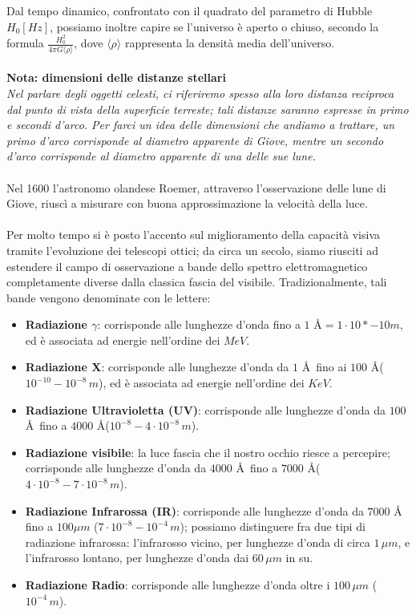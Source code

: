 Dal tempo dinamico, confrontato con il quadrato del parametro di Hubble $H_0 \left[Hz \right]$, possiamo inoltre capire se l'universo è aperto o chiuso, secondo la formula $\frac{H_0 ^2}{4 \pi G \langle \rho \rangle}$, dove $\langle \rho \rangle$ rappresenta la densità media dell'universo.
\\
\\
\textbf{Nota: dimensioni delle distanze stellari}\\
\textit{Nel parlare degli oggetti celesti, ci riferiremo spesso alla loro distanza reciproca dal punto di vista della superficie terreste; tali distanze saranno espresse in primo e secondi d'arco. Per farci un idea delle dimensioni che andiamo a trattare, un primo d'arco corrisponde al diametro apparente di Giove, mentre un secondo d'arco corrisponde al diametro apparente di una delle sue lune.}
\\
\\
Nel 1600 l'astronomo olandese Roemer, attraverso l'osservazione delle lune di Giove, riuscì a misurare con buona approssimazione la velocità della luce.
\\
\\
Per molto tempo si è posto l'accento sul miglioramento della capacità visiva tramite l'evoluzione dei telescopi ottici; da circa un secolo, siamo riusciti ad estendere il campo di osservazione a bande dello spettro elettromagnetico completamente diverse dalla classica fascia del visibile. Tradizionalmente, tali bande vengono denominate con le lettere:
\begin{itemize}
	\item \textbf{Radiazione $\gamma$}: corrisponde alle lunghezze d'onda fino a $1$ \AA$=1 \cdot 10*{-10} m$, ed è associata ad energie nell'ordine dei $MeV$.
	\item \textbf{Radiazione X}: corrisponde alle lunghezze d'onda da $1$ \AA \, fino ai $100$ \AA ($10^{-10}-10^{-8} \, m$), ed è associata ad energie nell'ordine dei $KeV$.
	\item \textbf{Radiazione Ultravioletta (UV)}: corrisponde alle lunghezze d'onda da $100$ \AA \, fino a $4000$ \AA ($10^{-8}-4 \cdot 10^{-8} \, m$).
	\item \textbf{Radiazione visibile}: la luce fascia che il nostro occhio riesce a percepire; corrisponde alle lunghezze d'onda da $4000$ \AA \, fino a $7000$ \AA ($4 \cdot 10^{-8}-7 \cdot 10^{-8} \, m$).
	\item \textbf{Radiazione Infrarossa (IR)}: corrisponde alle lunghezze d'onda da $7000$ \AA \, fino a $100 \mu m$ ($7 \cdot 10^{-8}-10^{-4} \, m$); possiamo distinguere fra due tipi di radiazione infrarossa: l'infrarosso vicino, per lunghezze d'onda di circa $1 \, \mu m$, e l'infrarosso lontano, per lunghezze d'onda dai $60 \, \mu m$ in su.
	\item \textbf{Radiazione Radio}: corrisponde alle lunghezze d'onda oltre i $100 \, \mu m$ ($10^{-4} \, m$). 
\end{itemize}
